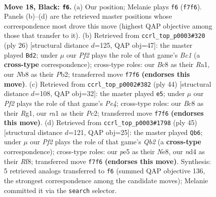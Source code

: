 \documentclass[11pt]{article}
\begin{document}
\clearpage

\begin{figure}[p]\centering
\begin{subfigure}{0.46\textwidth}\centering
\resizebox{\linewidth}{!}{%
\newchessgame
\chessboard[
  setfen={rnbqnrk1/1p3ppp/8/p1b1Pp1P/P1PN3R/6P1/6B1/RNBQ2K1 b - - 1 18},
  showmover=false,
  pgfstyle=straightmove, color=movearrow, markmove={f7-f6}
]}
\caption{}
\end{subfigure}\hfill
\begin{subfigure}{0.46\textwidth}\centering
\resizebox{\linewidth}{!}{%
\newchessgame
\chessboard[
  setfen={r3k2r/pp3ppp/1qn5/2bQPb2/8/5N2/PP2BPPP/R1B2RK1 w kq - 1 14},
  showmover=false,
  pgfstyle=straightmove, color=movearrow, markmove={c1-d2}
]}
\caption{}
\end{subfigure}
\\[4pt]
\begin{subfigure}{0.46\textwidth}\centering
\resizebox{\linewidth}{!}{%
\newchessgame
\chessboard[
  setfen={r1b2brk/2q2p1n/p1np4/6P1/1p2Pp1Q/3B4/PPPNN2P/1K1R2R1 w - - 0 23},
  showmover=false,
  pgfstyle=straightmove, color=movearrow, markmove={e4-e5}
]}
\caption{}
\end{subfigure}\hfill
\begin{subfigure}{0.46\textwidth}\centering
\resizebox{\linewidth}{!}{%
\newchessgame
\chessboard[
  setfen={r3nrk1/1q1b1p1p/3p1PpB/pp6/3Np2Q/P2P4/1P5P/R4R1K b - - 1 23},
  showmover=false,
  pgfstyle=straightmove, color=movearrow, markmove={b7-b6}
]}
\caption{}
\end{subfigure}
\caption{\textbf{Move 18, Black: \texttt{f6}.} (a) Our position; Melanie plays \texttt{f6} (\texttt{f7f6}). Panels (b)--(d) are the retrieved master positions whose correspondence most drove this move (highest QAP objective among those that transfer to it). (b) Retrieved from \texttt{ccrl\_top\_p0003\#320} (ply 26) [structural distance $d$=125, QAP obj=47]: the master played \texttt{Bd2}; under $\mu$ our \emph{Pf2} plays the role of that game's \emph{Bc1} (a \textbf{cross-type} correspondence); cross-type roles: our \emph{B}c8 as their \emph{R}a1, our \emph{N}b8 as their \emph{P}b2; transferred move \texttt{f7f6} \textbf{(endorses this move)}. (c) Retrieved from \texttt{ccrl\_top\_p0002\#382} (ply 44) [structural distance $d$=108, QAP obj=32]: the master played \texttt{e5}; under $\mu$ our \emph{Pf2} plays the role of that game's \emph{Pe4}; cross-type roles: our \emph{B}c8 as their \emph{R}g1, our \emph{r}a1 as their \emph{P}c2; transferred move \texttt{f7f6} \textbf{(endorses this move)}. (d) Retrieved from \texttt{ccrl\_top\_p0003\#1798} (ply 45) [structural distance $d$=121, QAP obj=25]: the master played \texttt{Qb6}; under $\mu$ our \emph{Pf2} plays the role of that game's \emph{Qb2} (a \textbf{cross-type} correspondence); cross-type roles: our \emph{p}e5 as their \emph{N}e8, our \emph{n}d4 as their \emph{R}f8; transferred move \texttt{f7f6} \textbf{(endorses this move)}. Synthesis: 5 retrieved analogs transferred to \texttt{f6} (summed QAP objective 136, the strongest correspondence among the candidate moves); Melanie committed it via the \texttt{search} selector.}
\label{fig:thought-m35}
\end{figure}
\end{document}
